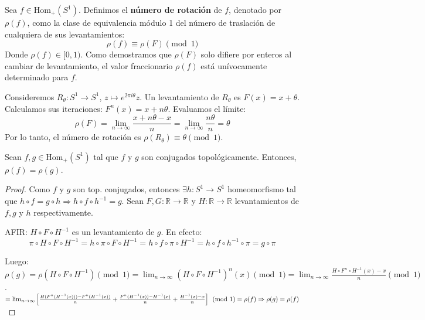 \begin{definicion}
	Sea $f \in \text{Hom}_+(S^1)$. Definimos el \textbf{número de rotación} de $f$, denotado por $\rho(f)$, como la clase de equivalencia módulo 1 del número de traslación de cualquiera de sus levantamientos:
	$$ \rho(f) \equiv \rho(F) \pmod 1 $$
	Donde $\rho(f) \in [0, 1)$. Como demostramos que $\rho(F)$ solo difiere por enteros al cambiar de levantamiento, el valor fraccionario $\rho(f)$ está unívocamente determinado para $f$.
\end{definicion}

\begin{ejemplo}
	Consideremos $R_\theta: S^1 \to S^1$, $z \mapsto e^{2\pi i \theta}z$. 
	Un levantamiento de $R_\theta$ es $F(x) = x + \theta$.
	Calculamos sus iteraciones: $F^n(x) = x + n\theta$.
	Evaluamos el límite:
	$$ \rho(F) = \lim_{n \to \infty} \frac{x + n\theta - x}{n} = \lim_{n \to \infty} \frac{n\theta}{n} = \theta $$
	Por lo tanto, el número de rotación es $\rho(R_\theta) \equiv \theta \pmod 1$.
\end{ejemplo}

\begin{proposicion}
	Sean $f, g \in \text{Hom}_+(S^1)$ tal que $f$ y $g$ son conjugados topológicamente. Entonces, $\rho(f) = \rho(g)$.
\end{proposicion}
\begin{proof}
	Como $f$ y $g$ son top. conjugados, entonces $\exists h: S^1 \to S^1$ homeomorfismo tal que $h \circ f = g \circ h \Rightarrow h \circ f \circ h^{-1} = g$. Sean $F, G: \mathbb{R} \to \mathbb{R}$ y $H: \mathbb{R} \to \mathbb{R}$ levantamientos de $f, g$ y $h$ respectivamente.
	
	AFIR: $H \circ F \circ H^{-1}$ es un levantamiento de $g$. En efecto:
	$$ \pi \circ H \circ F \circ H^{-1} = h \circ \pi \circ F \circ H^{-1} = h \circ f \circ \pi \circ H^{-1} = h \circ f \circ h^{-1} \circ \pi = g \circ \pi $$
	
	Luego: $\rho(g) = \rho(H \circ F \circ H^{-1}) \pmod 1 = \lim_{n \to \infty} (H \circ F \circ H^{-1})^n(x) \pmod 1 = \lim_{n \to \infty} \frac{H \circ F^n \circ H^{-1}(x) - x}{n} \pmod 1$.\newline
	$= \lim_{n \to \infty} \left[ \frac{H(F^n(H^{-1}(x))) - F^n(H^{-1}(x))}{n} + \frac{F^n(H^{-1}(x)) - H^{-1}(x)}{n} + \frac{H^{-1}(x) - x}{n} \right] \pmod 1 \\= \rho(f) \Rightarrow \rho(g) = \rho(f)$
\end{proof}

